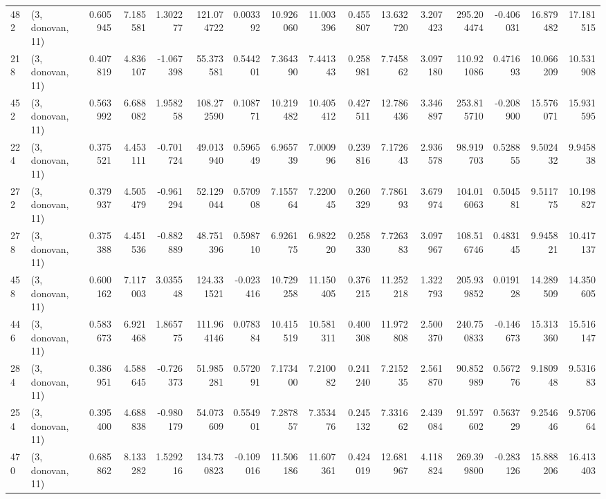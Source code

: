 \begin{tabular}{llrrrrrrrrrrrrrr}
482 &  (3, donovan, 11) &   0.605945 &   7.185581 &   1.302277 &   121.074722 &   0.003392 &  10.926060 &  11.003396 &  0.455807 &  13.632720 &   3.207423 &   295.204474 &  -0.406031 &  16.879482 &  17.181515 \\
218 &  (3, donovan, 11) &   0.407819 &   4.836107 &  -1.067398 &    55.373581 &   0.544201 &   7.364390 &   7.441343 &  0.258981 &   7.745862 &   3.097180 &   110.921086 &   0.471693 &  10.066209 &  10.531908 \\
452 &  (3, donovan, 11) &   0.563992 &   6.688082 &   1.958258 &   108.272590 &   0.108771 &  10.219482 &  10.405412 &  0.427511 &  12.786436 &   3.346897 &   253.815710 &  -0.208900 &  15.576071 &  15.931595 \\
224 &  (3, donovan, 11) &   0.375521 &   4.453111 &  -0.701724 &    49.013940 &   0.596549 &   6.965739 &   7.000996 &  0.239816 &   7.172643 &   2.936578 &    98.919703 &   0.528855 &   9.502432 &   9.945838 \\
272 &  (3, donovan, 11) &   0.379937 &   4.505479 &  -0.961294 &    52.129044 &   0.570908 &   7.155764 &   7.220045 &  0.260329 &   7.786193 &   3.679974 &   104.016063 &   0.504581 &   9.511775 &  10.198827 \\
278 &  (3, donovan, 11) &   0.375388 &   4.451536 &  -0.882889 &    48.751396 &   0.598710 &   6.926175 &   6.982220 &  0.258330 &   7.726383 &   3.097967 &   108.516746 &   0.483145 &   9.945821 &  10.417137 \\
458 &  (3, donovan, 11) &   0.600162 &   7.117003 &   3.035548 &   124.331521 &  -0.023416 &  10.729258 &  11.150405 &  0.376215 &  11.252218 &   1.322793 &   205.939852 &   0.019128 &  14.289509 &  14.350605 \\
446 &  (3, donovan, 11) &   0.583673 &   6.921468 &   1.865775 &   111.964146 &   0.078384 &  10.415519 &  10.581311 &  0.400308 &  11.972808 &   2.500370 &   240.750833 &  -0.146673 &  15.313360 &  15.516147 \\
284 &  (3, donovan, 11) &   0.386951 &   4.588645 &  -0.726373 &    51.985281 &   0.572091 &   7.173400 &   7.210082 &  0.241240 &   7.215235 &   2.561870 &    90.852989 &   0.567276 &   9.180948 &   9.531683 \\
254 &  (3, donovan, 11) &   0.395400 &   4.688838 &  -0.980179 &    54.073609 &   0.554901 &   7.287857 &   7.353476 &  0.245132 &   7.331662 &   2.439084 &    91.597602 &   0.563729 &   9.254646 &   9.570664 \\
470 &  (3, donovan, 11) &   0.685862 &   8.133282 &   1.529216 &   134.730823 &  -0.109016 &  11.506186 &  11.607361 &  0.424019 &  12.681967 &   4.118824 &   269.399800 &  -0.283126 &  15.888206 &  16.413403 \\

\end{tabular}
